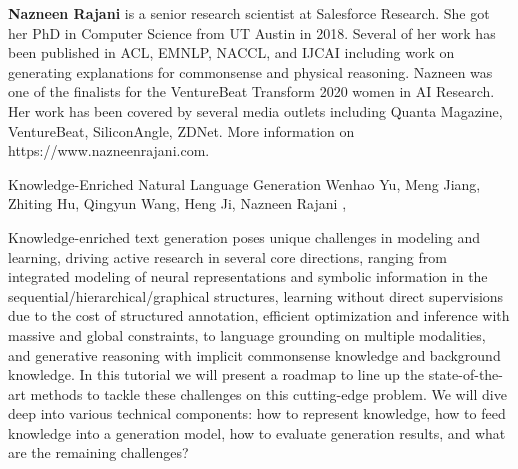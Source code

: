 \begin{bio}
  {\bfseries Nazneen Rajani} is a senior research scientist at Salesforce Research. She got her PhD in Computer Science from UT Austin in 2018. Several of her work has been published in ACL, EMNLP, NACCL, and IJCAI including work on generating explanations for commonsense and physical reasoning. Nazneen was one of the finalists for the VentureBeat Transform 2020 women in AI Research. Her work has been covered by several media outlets including Quanta Magazine, VentureBeat, SiliconAngle, ZDNet. More information on https://www.nazneenrajani.com.

\end{bio}

\begin{tutorial}
  {Knowledge-Enriched Natural Language Generation}
  {Wenhao Yu, Meng Jiang, Zhiting Hu, Qingyun Wang, Heng Ji, Nazneen Rajani}
  {\daydateyear, \tutorialmorningtime}


Knowledge-enriched text generation poses unique challenges in modeling and learning, driving active research in several core directions, ranging from integrated modeling of neural representations and symbolic information in the sequential/hierarchical/graphical structures, learning without direct supervisions due to the cost of structured annotation, efficient optimization and inference with massive and global constraints, to language grounding on multiple modalities, and generative reasoning with implicit commonsense knowledge and background knowledge. In this tutorial we will present a roadmap to line up the state-of-the-art methods to tackle these challenges on this cutting-edge problem. We will dive deep into various technical components: how to represent knowledge, how to feed knowledge into a generation model, how to evaluate generation results, and what are the remaining challenges?

\end{tutorial}
